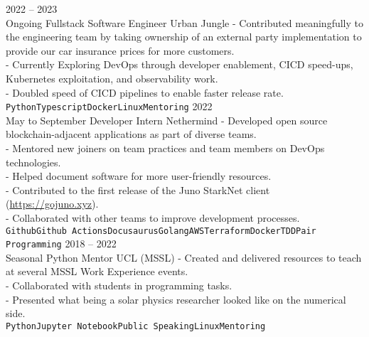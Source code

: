 \documentclass[9pt]{developercv} %
\begin{document}
\vspace{0.5cm}



\begin{entrylist}
\entry
		{2022 -- 2023\\\footnotesize{Ongoing}}
		{Fullstack Software Engineer}
		{Urban Jungle}
		{
  - Contributed meaningfully to the engineering team by taking ownership of an external party implementation to provide our car insurance prices for more customers.\\
  - Currently Exploring DevOps through developer enablement, CICD speed-ups, Kubernetes exploitation, and observability work.\\
  - Doubled speed of CICD pipelines to enable faster release rate.\\
  \texttt{Python}\slashsep\texttt{Typescript}\slashsep\texttt{Docker}\slashsep\texttt{Linux}\slashsep\texttt{Mentoring}}
	\entry
		{2022\\\footnotesize{May to September}}
		{Developer Intern}
		{Nethermind}
		{
  - Developed open source blockchain-adjacent applications as part of diverse teams. \\
  - Mentored new joiners on team practices and team members on DevOps technologies. \\
  - Helped document software for more user-friendly resources. \\
  - Contributed to the first release of the Juno StarkNet client (\href{https://gojuno.xyz}{https://gojuno.xyz}).\\
  - Collaborated with other teams to improve development processes.\\\texttt{Github}\slashsep\texttt{Github Actions}\slashsep\texttt{Docusaurus}\slashsep\texttt{Golang}\slashsep\texttt{AWS}\slashsep\texttt{Terraform}\slashsep\texttt{Docker}\slashsep\texttt{TDD}\slashsep\texttt{Pair Programming}}
	\entry
		{2018 -- 2022\\\footnotesize{Seasonal}}
		{Python Mentor}
		{UCL (MSSL)}
		{
  - Created and delivered resources to teach at several MSSL Work Experience events.\\
  - Collaborated with students in programming tasks.\\
  - Presented what being a solar physics researcher looked like on the numerical side.
  \\ \texttt{Python}\slashsep\texttt{Jupyter Notebook}\slashsep\texttt{Public Speaking}\slashsep\texttt{Linux}\slashsep\texttt{Mentoring}}
\end{entrylist}
\end{document}
